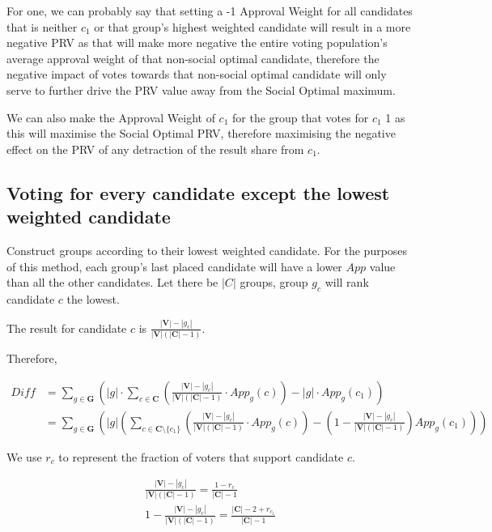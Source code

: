 \documentclass{article}
\begin{document}
For one, we can probably say that setting a -1 Approval Weight for all candidates that is neither $c_1$ or that group's highest weighted candidate will result in a more negative PRV as that will make more negative the entire voting population's average approval weight of that non-social optimal candidate, therefore the negative impact of votes towards that non-social optimal candidate will only serve to further drive the PRV value away from the Social Optimal maximum.

We can also make the Approval Weight of $c_1$ for the group that votes for $c_1$ 1 as this will maximise the Social Optimal PRV, therefore maximising the negative effect on the PRV of any detraction of the result share from $c_1$.


\subsection{Voting for every candidate except the lowest weighted candidate}

Construct groups according to their lowest weighted candidate. For the purposes of this method, each group's last placed candidate will have a lower $App$ value than all the other candidates. Let there be $|C|$ groups, group $g_c$ will rank candidate $c$ the lowest.

The result for candidate $c$ is $\frac{|\boldsymbol{V}|-|g_c|}{|\boldsymbol{V}|(|\boldsymbol{C}|-1)}$.

Therefore,

\begin{equation}
\begin{aligned}
Diff &= \sum^{}_{g \in \boldsymbol{G}}{\left(|g| \cdot \sum^{}_{c \in \boldsymbol{C}}{\left(\frac{|\boldsymbol{V}|-|g_c|}{|\boldsymbol{V}|(|\boldsymbol{C}|-1)} \cdot App_g(c)\right)} - |g| \cdot App_g(c_1) \right)}\\
&= \sum^{}_{g \in \boldsymbol{G}}{\left(|g| \left( \sum^{}_{c \in \boldsymbol{C} \setminus \{c_1\}}{\left(\frac{|\boldsymbol{V}|-|g_c|}{|\boldsymbol{V}|(|\boldsymbol{C}|-1)} \cdot App_g(c)\right)} - \left(1 - \frac{|\boldsymbol{V}|-|g_c|}{|\boldsymbol{V}|(|\boldsymbol{C}|-1)}\right)App_g(c_1) \right) \right)}
\end{aligned}
\end{equation} 

We use $r_c$ to represent the fraction of voters that support candidate $c$.

\begin{gather} 
\frac{|\boldsymbol{V}|-|g_c|}{|\boldsymbol{V}|(|\boldsymbol{C}|-1)} = \frac{1-r_c}{|\boldsymbol{C}|-1} \\
1-\frac{|\boldsymbol{V}|-|g_c|}{|\boldsymbol{V}|(|\boldsymbol{C}|-1)} = \frac{|\boldsymbol{C}|-2+r_{c_1}}{|\boldsymbol{C}|-1}
\end{gather}
\end{document}
